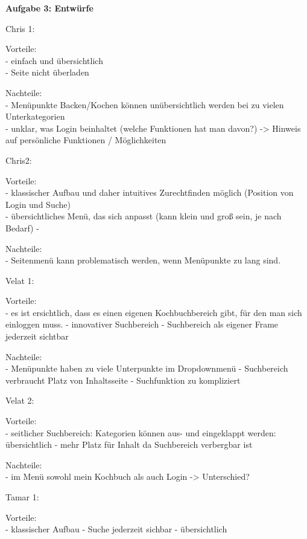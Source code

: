 \documentclass[parskip,10pt,abstracton]{scrartcl}
\renewcommand*{\maketitle}{%
	{\centering\LARGE\sffamily\bfseries Aufgabe 3: Entwürfe \par}
	\vspace{3em}
}
\begin{document}
\maketitle


Chris 1:

Vorteile: \\
- einfach und übersichtlich\\
- Seite nicht überladen

Nachteile: \\
- Menüpunkte Backen/Kochen können unübersichtlich werden bei zu vielen Unterkategorien\\
- unklar, was Login beinhaltet (welche Funktionen hat man davon?) -> Hinweis auf persönliche Funktionen / Möglichkeiten

Chris2:

Vorteile:\\
- klassischer Aufbau und daher intuitives Zurechtfinden möglich (Position von Login und Suche) \\
- übersichtliches Menü, das sich anpasst (kann klein und groß sein, je nach Bedarf)
-

Nachteile:\\
- Seitenmenü kann problematisch werden, wenn Menüpunkte zu lang sind.


Velat 1:

Vorteile:\\
- es ist ersichtlich, dass es einen eigenen Kochbuchbereich gibt, für den man sich einloggen muss.
- innovativer Suchbereich
- Suchbereich als eigener Frame jederzeit sichtbar


Nachteile:\\
- Menüpunkte haben zu viele Unterpunkte im Dropdownmenü
- Suchbereich verbraucht Platz von Inhaltsseite
- Suchfunktion zu kompliziert

Velat 2:

Vorteile:\\
- seitlicher Suchbereich: Kategorien können aus- und eingeklappt werden: übersichtlich
- mehr Platz für Inhalt da Suchbereich verbergbar ist

Nachteile:\\
- im Menü sowohl mein Kochbuch als auch Login -> Unterschied?

Tamar 1:

Vorteile: \\
- klassischer Aufbau
- Suche jederzeit sichbar
- übersichtlich
\end{document}
